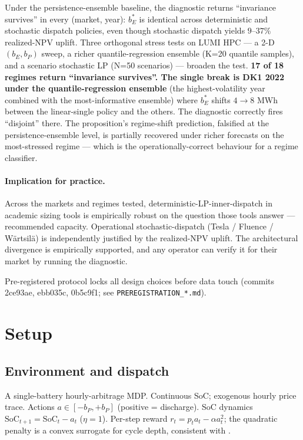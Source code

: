 \documentclass[11pt]{article}
\begin{document}
Under the persistence-ensemble baseline, the diagnostic returns ``invariance survives'' in every (market, year): $b_E^*$ is identical across deterministic and stochastic dispatch policies, even though stochastic dispatch yields $9$--$37\%$ realized-NPV uplift. Three orthogonal stress tests on LUMI HPC --- a 2-D $(b_E, b_P)$ sweep, a richer quantile-regression ensemble (K=20 quantile samples), and a scenario stochastic LP (N=50 scenarios) --- broaden the test. \textbf{17 of 18 regimes return ``invariance survives''. The single break is DK1 2022 under the quantile-regression ensemble} (the highest-volatility year combined with the most-informative ensemble) where $b_E^*$ shifts $4 \to 8$ MWh between the linear-single policy and the others. The diagnostic correctly fires ``disjoint'' there. The proposition's regime-shift prediction, falsified at the persistence-ensemble level, is partially recovered under richer forecasts on the most-stressed regime --- which is the operationally-correct behaviour for a regime classifier.

\paragraph{Implication for practice.} Across the markets and regimes tested, deterministic-LP-inner-dispatch in academic sizing tools is empirically robust on the question those tools answer --- recommended capacity. Operational stochastic-dispatch (Tesla / Fluence / W\"{a}rtsil\"{a}) is independently justified by the realized-NPV uplift. The architectural divergence is empirically supported, and any operator can verify it for their market by running the diagnostic.

Pre-registered protocol locks all design choices before data touch (commits 2ce93ae, ebb035c, 0b5c9f1; see \texttt{PREREGISTRATION\_*.md}).

\section{Setup}

\subsection{Environment and dispatch}

A single-battery hourly-arbitrage MDP. Continuous SoC; exogenous hourly price trace. Actions $a \in [-b_P, +b_P]$ (positive = discharge). SoC dynamics $\mathrm{SoC}_{t+1} = \mathrm{SoC}_t - a_t$ ($\eta = 1$). Per-step reward $r_t = p_t a_t - \alpha a_t^2$; the quadratic penalty is a convex surrogate for cycle depth, consistent with \citet{shi2017convex}.
\end{document}
